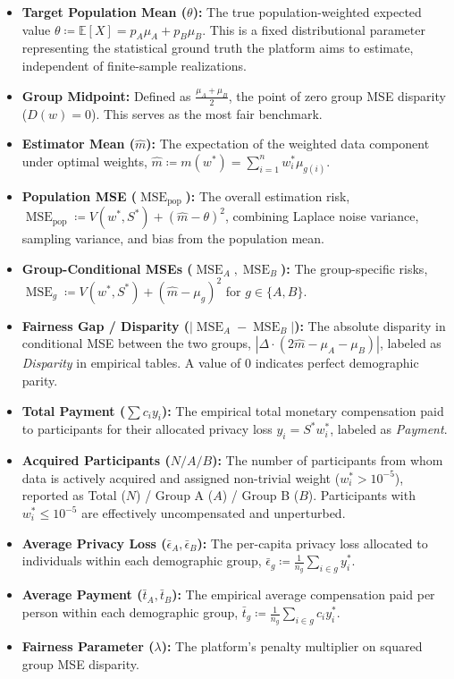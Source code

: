 \documentclass[11pt,a4paper]{article}
\newcommand{\E}{\mathbb{E}}
\newcommand{\MSE}{\operatorname{MSE}}
\begin{document}
\begin{itemize}[leftmargin=1.5em]
    \item \textbf{Target Population Mean ($\theta$):} The true population-weighted expected value $\theta \coloneqq \E[X] = p_A \mu_A + p_B \mu_B$. This is a fixed distributional parameter representing the statistical ground truth the platform aims to estimate, independent of finite-sample realizations.
    \item \textbf{Group Midpoint:} Defined as $\frac{\mu_A + \mu_B}{2}$, the point of zero group MSE disparity ($D(w) = 0$). This serves as the most fair benchmark.
    \item \textbf{Estimator Mean ($\widehat{m}$):} The expectation of the weighted data component under optimal weights, $\widehat{m} \coloneqq m(w^*) = \sum_{i=1}^n w_i^* \mu_{g(i)}$.
    \item \textbf{Population MSE ($\MSE_{\mathrm{pop}}$):} The overall estimation risk, $\MSE_{\mathrm{pop}} \coloneqq V(w^*, S^*) + (\widehat{m} - \theta)^2$, combining Laplace noise variance, sampling variance, and bias from the population mean.
    \item \textbf{Group-Conditional MSEs ($\MSE_A, \MSE_B$):} The group-specific risks, $\MSE_g \coloneqq V(w^*, S^*) + (\widehat{m} - \mu_g)^2$ for $g \in \{A, B\}$.
    \item \textbf{Fairness Gap / Disparity ($|\MSE_A - \MSE_B|$):} The absolute disparity in conditional MSE between the two groups, $|\Delta \cdot (2\widehat{m} - \mu_A - \mu_B)|$, labeled as \emph{Disparity} in empirical tables. A value of $0$ indicates perfect demographic parity.
    \item \textbf{Total Payment ($\sum c_i y_i$):} The empirical total monetary compensation paid to participants for their allocated privacy loss $y_i = S^* w_i^*$, labeled as \emph{Payment}.
    \item \textbf{Acquired Participants ($N / A / B$):} The number of participants from whom data is actively acquired and assigned non-trivial weight ($w_i^* > 10^{-5}$), reported as Total ($N$) / Group A ($A$) / Group B ($B$). Participants with $w_i^* \le 10^{-5}$ are effectively uncompensated and unperturbed.
    \item \textbf{Average Privacy Loss ($\bar{\epsilon}_A, \bar{\epsilon}_B$):} The per-capita privacy loss allocated to individuals within each demographic group, $\bar{\epsilon}_g \coloneqq \frac{1}{n_g} \sum_{i \in g} y_i^*$.
    \item \textbf{Average Payment ($\bar{t}_A, \bar{t}_B$):} The empirical average compensation paid per person within each demographic group, $\bar{t}_g \coloneqq \frac{1}{n_g} \sum_{i \in g} c_i y_i^*$.
    \item \textbf{Fairness Parameter ($\lambda$):} The platform's penalty multiplier on squared group MSE disparity.
\end{itemize}
\end{document}
